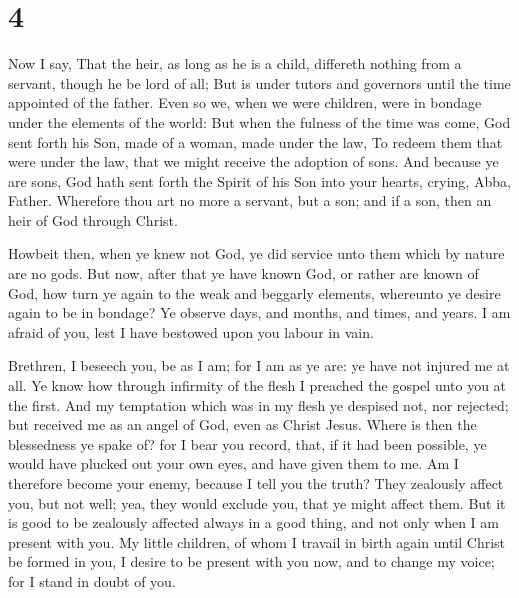 \hypertarget{section-3}{%
\section{4}\label{section-3}}

 Now I say, That the heir, as long as he is a child,
differeth nothing from a servant, though he be lord of all;
 But is under tutors and governors until the time
appointed of the father.  Even so we, when we were
children, were in bondage under the elements of the world:
 But when the fulness of the time was come, God sent forth
his Son, made of a woman, made under the law,  To redeem
them that were under the law, that we might receive the adoption of
sons.  And because ye are sons, God hath sent forth the
Spirit of his Son into your hearts, crying, Abba, Father. 
Wherefore thou art no more a servant, but a son; and if a son, then an
heir of God through Christ.

 Howbeit then, when ye knew not God, ye did service unto
them which by nature are no gods.  But now, after that ye
have known God, or rather are known of God, how turn ye again to the
weak and beggarly elements, whereunto ye desire again to be in bondage?
 Ye observe days, and months, and times, and years.
 I am afraid of you, lest I have bestowed upon you labour
in vain.

 Brethren, I beseech you, be as I am; for I am as ye are:
ye have not injured me at all.  Ye know how through
infirmity of the flesh I preached the gospel unto you at the first.
 And my temptation which was in my flesh ye despised not,
nor rejected; but received me as an angel of God, even as Christ Jesus.
 Where is then the blessedness ye spake of? for I bear
you record, that, if it had been possible, ye would have plucked out
your own eyes, and have given them to me.  Am I therefore
become your enemy, because I tell you the truth?  They
zealously affect you, but not well; yea, they would exclude you, that ye
might affect them.  But it is good to be zealously
affected always in a good thing, and not only when I am present with
you.  My little children, of whom I travail in birth
again until Christ be formed in you,  I desire to be
present with you now, and to change my voice; for I stand in doubt of
you.

